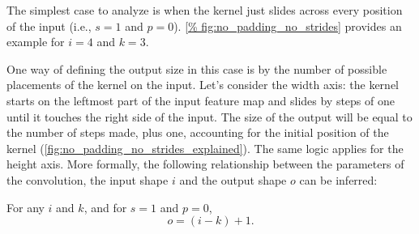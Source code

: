 The simplest case to analyze is when the kernel just slides across every
position of the input (i.e., $s = 1$ and $p = 0$). \autoref{%
fig:no_padding_no_strides} provides an example for $i = 4$ and $k = 3$.

One way of defining the output size in this case is by the number of possible
placements of the kernel on the input. Let's consider the width axis: the kernel
starts on the leftmost part of the input feature map and slides by steps of one
until it touches the right side of the input. The size of the output will be
equal to the number of steps made, plus one, accounting for the initial position
of the kernel (\autoref{fig:no_padding_no_strides_explained}). The same logic
applies for the height axis. More formally, the following relationship between
the parameters of the convolution, the input shape $i$ and the output shape $o$
can be inferred:

\begin{relationship}\label{rel:no_padding_no_strides}
For any $i$ and $k$, and for $s = 1$ and $p = 0$,
\begin{equation*}
    o = (i - k) + 1.
\end{equation*}
\end{relationship}

